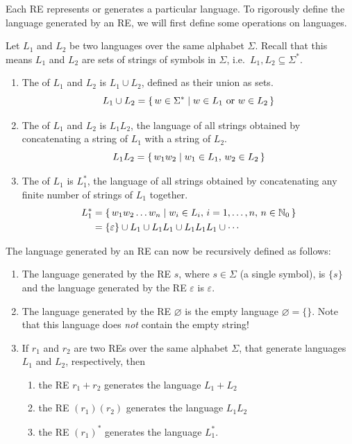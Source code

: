Each RE represents or generates a particular language. To rigorously define the language generated by an RE, we will first define some operations on languages.

Let $L_1$ and $L_2$ be two languages over the same alphabet $\Sigma$. Recall that this means $L_1$ and $L_2$ are sets of strings of symbols in $\Sigma$, i.e.\ $L_1, L_2 \subseteq \Sigma^*$.
\begin{enumerate}
\item The  of $L_1$ and $L_2$ is $L_1 \cup L_2$, defined as their union as sets.
\begin{equation*}
L_1 \cup L_2 = \qty{\, w \in \Sigma^* \mid w \in L_1 ~\text{or}~ w \in L_2 \,}
\end{equation*}

\item The  of $L_1$ and $L_2$ is $L_1 L_2$, the language of all strings obtained by concatenating a string of $L_1$ with a string of $L_2$.
\begin{equation*}
L_1 L_2 = \qty{\, w_1 w_2 \mid w_1 \in L_1,\, w_2 \in L_2 \,}
\end{equation*}

\item The  of $L_1$ is $L_1^*$, the language of all strings obtained by concatenating any finite number of strings of $L_1$ together.
\begin{align*}
L_1^* & = \qty{\, w_1 w_2 \dots w_n \mid w_i \in L_i,\, i = 1, \ldots, n,\, n \in \mathbb N_0 \,} \\
& = \{\varepsilon\} \cup L_1 \cup L_1 L_1 \cup L_1 L_1 L_1 \cup \cdots
\end{align*}
\end{enumerate}

The language generated by an RE can now be recursively defined as follows:
\begin{enumerate}
\item The language generated by the RE $s$, where $s \in \Sigma$ (a single symbol), is $\{s\}$ and the language generated by the RE $\varepsilon$ is ${\varepsilon}$.
\item The language generated by the RE $\varnothing$ is the empty language $\varnothing = \{\}$. Note that this language does \emph{not} contain the empty string!
\item If $r_1$ and $r_2$ are two REs over the same alphabet $\Sigma$, that generate languages $L_1$ and $L_2$, respectively, then
\begin{enumerate}
\item the RE $r_1 + r_2$ generates the language $L_1 + L_2$
\item the RE $(r_1)(r_2)$ generates the language $L_1 L_2$
\item the RE $(r_1)^*$ generates the language $L_1^*$.
\end{enumerate}
\end{enumerate}

